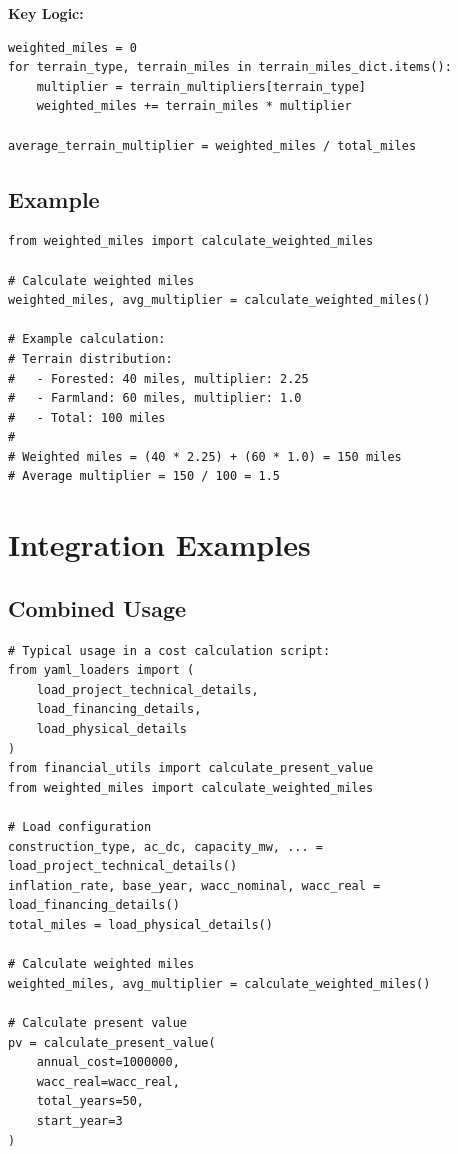 \documentclass[ctcc_full_documentation.tex]{subfiles}
\begin{document}
\textbf{Key Logic:}
\begin{lstlisting}
weighted_miles = 0
for terrain_type, terrain_miles in terrain_miles_dict.items():
    multiplier = terrain_multipliers[terrain_type]
    weighted_miles += terrain_miles * multiplier

average_terrain_multiplier = weighted_miles / total_miles
\end{lstlisting}

\subsection{Example}

\begin{lstlisting}
from weighted_miles import calculate_weighted_miles

# Calculate weighted miles
weighted_miles, avg_multiplier = calculate_weighted_miles()

# Example calculation:
# Terrain distribution:
#   - Forested: 40 miles, multiplier: 2.25
#   - Farmland: 60 miles, multiplier: 1.0
#   - Total: 100 miles
#
# Weighted miles = (40 * 2.25) + (60 * 1.0) = 150 miles
# Average multiplier = 150 / 100 = 1.5
\end{lstlisting}

\section{Integration Examples}

\subsection{Combined Usage}

\begin{lstlisting}
# Typical usage in a cost calculation script:
from yaml_loaders import (
    load_project_technical_details,
    load_financing_details,
    load_physical_details
)
from financial_utils import calculate_present_value
from weighted_miles import calculate_weighted_miles

# Load configuration
construction_type, ac_dc, capacity_mw, ... = load_project_technical_details()
inflation_rate, base_year, wacc_nominal, wacc_real = load_financing_details()
total_miles = load_physical_details()

# Calculate weighted miles
weighted_miles, avg_multiplier = calculate_weighted_miles()

# Calculate present value
pv = calculate_present_value(
    annual_cost=1000000,
    wacc_real=wacc_real,
    total_years=50,
    start_year=3
)
\end{lstlisting}
\end{document}
